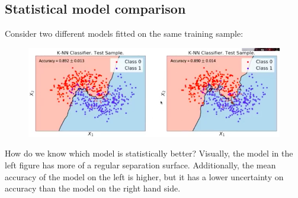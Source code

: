 \subsection{Statistical model comparison}
Consider two different models fitted on the same training sample:
\begin{figure}[H]
\centering
\includegraphics[scale=0.4]{statisticalcomparison.png}
\end{figure}
How do we know which model is statistically better? Visually, the model in the left figure has more of a regular separation surface. Additionally, the mean accuracy of the model on the left is higher, but it has a lower uncertainty on accuracy than the model on the right hand side.\\


